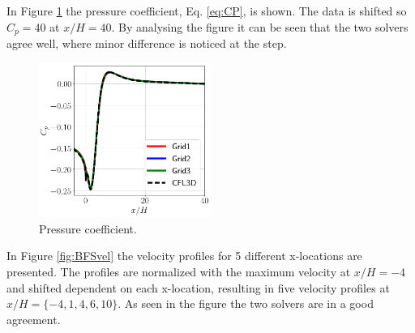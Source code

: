 In Figure \ref{fig:BFSCP} the pressure coefficient, Eq. \ref{eq:CP}, is shown. The data is shifted so $C_p=40$ at $x/H=40$. By analysing the figure it can be seen that the two solvers agree well, where minor difference is noticed at the step.
\begin{figure}[h!]
  \centering
  \includegraphics[width=0.5\textwidth]{figures/BFSCp.png}
  \caption{Pressure coefficient.} \label{fig:BFSCP}
\end{figure}

In Figure \ref{fig:BFSvel} the velocity profiles for 5 different x-locations are presented. The profiles are normalized with the maximum velocity at $x/H=-4$ and shifted dependent on each x-location, resulting in five velocity profiles at $x/H=\{-4,1,4,6,10\}$. As seen in the figure the two solvers are in a good agreement. 

